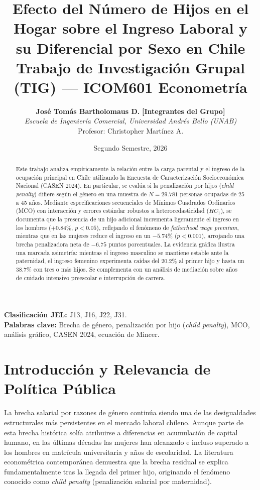 \documentclass[11pt,a4paper]{article}
\title{\vspace{-1cm}\textbf{Efecto del Número de Hijos en el Hogar sobre el Ingreso Laboral y su Diferencial por Sexo en Chile}\\
\large Trabajo de Investigación Grupal (TIG) --- ICOM601 Econometría}
\author{
  \textbf{José Tomás Bartholomaus D.} \quad \textbf{[Integrantes del Grupo]}\\[0.4em]
  \textit{Escuela de Ingeniería Comercial, Universidad Andrés Bello (UNAB)}\\
  \small Profesor: Christopher Martínez A.
}
\date{Segundo Semestre, 2026}
\begin{document}
\maketitle

\begin{abstract}
Este trabajo analiza empíricamente la relación entre la carga parental y el ingreso de la ocupación principal en Chile utilizando la Encuesta de Caracterización Socioeconómica Nacional (CASEN 2024). En particular, se evalúa si la penalización por hijos (\textit{child penalty}) difiere según el género en una muestra de $N = 29.781$ personas ocupadas de 25 a 45 años. Mediante especificaciones secuenciales de Mínimos Cuadrados Ordinarios (MCO) con interacción y errores estándar robustos a heterocedasticidad ($HC_1$), se documenta que la presencia de un hijo adicional incrementa ligeramente el ingreso en los hombres ($+0.84\%$, $p < 0.05$), reflejando el fenómeno de \textit{fatherhood wage premium}, mientras que en las mujeres reduce el ingreso en un $-5.74\%$ ($p < 0.001$), arrojando una brecha penalizadora neta de $-6.75$ puntos porcentuales. La evidencia gráfica ilustra una marcada asimetría: mientras el ingreso masculino se mantiene estable ante la paternidad, el ingreso femenino experimenta caídas del $20.2\%$ al primer hijo y hasta un $38.7\%$ con tres o más hijos. Se complementa con un análisis de mediación sobre años de cuidado intensivo preescolar e interrupción de carrera.
\end{abstract}

\vspace{0.3cm}
\noindent \textbf{Clasificación JEL:} J13, J16, J22, J31. \\
\textbf{Palabras clave:} Brecha de género, penalización por hijo (\textit{child penalty}), MCO, análisis gráfico, CASEN 2024, ecuación de Mincer.

\vspace{0.5cm}

\section{Introducción y Relevancia de Política Pública}
La brecha salarial por razones de género continúa siendo una de las desigualdades estructurales más persistentes en el mercado laboral chileno. Aunque parte de esta brecha histórica solía atribuirse a diferencias en acumulación de capital humano, en las últimas décadas las mujeres han alcanzado e incluso superado a los hombres en matrícula universitaria y años de escolaridad. La literatura econométrica contemporánea \cite{kleven2019, kleven2025} demuestra que la brecha residual se explica fundamentalmente tras la llegada del primer hijo, originando el fenómeno conocido como \textit{child penalty} (penalización salarial por maternidad).
\end{document}
